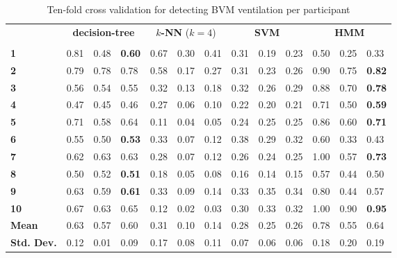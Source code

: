 \begin{table}[h]
	\centering
	\begin{tabular}{lllllllllllll}
		\multirow{2}{*}{\rotatebox[origin=c]{45}{\textbf{Participant}}}& \multicolumn{3}{c}{\textbf{decision-tree}} & \multicolumn{3}{c}{\textbf{$k$-NN} ($k=4$)} & \multicolumn{3}{c}{\textbf{SVM}} & \multicolumn{3}{c}{\textbf{HMM}} \\
		& \rot{Precision}     & \rot{Recall}    & \rot{F1}    & \rot{Precision}     & \rot{Recall}    & \rot{F1}  & \rot{Precision}     & \rot{Recall}    & \rot{F1} & \rot{Precision}     & \rot{Recall}    & \rot{F1} \\
		\textbf{1}   & 0.81 & 0.48 & \textbf{0.60} & 0.67 & 0.30 & 0.41 & 0.31 & 0.19 & 0.23 & 0.50 & 0.25 & 0.33 \\
		\textbf{2}   & 0.79 & 0.78 & 0.78 & 0.58 & 0.17 & 0.27 & 0.31 & 0.23 & 0.26 & 0.90 & 0.75 & \textbf{0.82} \\
		\textbf{3}   & 0.56 & 0.54 & 0.55 & 0.32 & 0.13 & 0.18 & 0.32 & 0.26 & 0.29 & 0.88 & 0.70 & \textbf{0.78} \\
		\textbf{4}   & 0.47 & 0.45 & 0.46 & 0.27 & 0.06 & 0.10 & 0.22 & 0.20 & 0.21 & 0.71 & 0.50 & \textbf{0.59} \\
		\textbf{5}   & 0.71 & 0.58 & 0.64 & 0.11 & 0.04 & 0.05 & 0.24 & 0.25 & 0.25 & 0.86 & 0.60 & \textbf{0.71} \\
		\textbf{6}   & 0.55 & 0.50 & \textbf{0.53} & 0.33 & 0.07 & 0.12 & 0.38 & 0.29 & 0.32 & 0.60 & 0.33 & 0.43 \\
		\textbf{7}   & 0.62 & 0.63 & 0.63 & 0.28 & 0.07 & 0.12 & 0.26 & 0.24 & 0.25 & 1.00 & 0.57 & \textbf{0.73} \\
		\textbf{8}   & 0.50 & 0.52 & \textbf{0.51} & 0.18 & 0.05 & 0.08 & 0.16 & 0.14 & 0.15 & 0.57 & 0.44 & 0.50 \\
		\textbf{9}   & 0.63 & 0.59 & \textbf{0.61} & 0.33 & 0.09 & 0.14 & 0.33 & 0.35 & 0.34 & 0.80 & 0.44 & 0.57 \\
		\textbf{10} & 0.67 & 0.63 & 0.65 & 0.12 & 0.02 & 0.03 & 0.30 & 0.33 & 0.32 & 1.00 & 0.90 & \textbf{0.95} \\
		\hline
		\textbf{Mean} & 0.63 & 0.57 & 0.60 & 0.31 & 0.10 & 0.14 & 0.28 & 0.25 & 0.26 & 0.78 & 0.55 & 0.64 \\
		\textbf{Std. Dev.} & 0.12 & 0.01 & 0.09 & 0.17 & 0.08 & 0.11 & 0.07 & 0.06 & 0.06 & 0.18 & 0.20 & 0.19
	\end{tabular}
	\caption{Ten-fold cross validation for detecting BVM ventilation per participant}
	\label{tab:bvm:ml}
\end{table}

